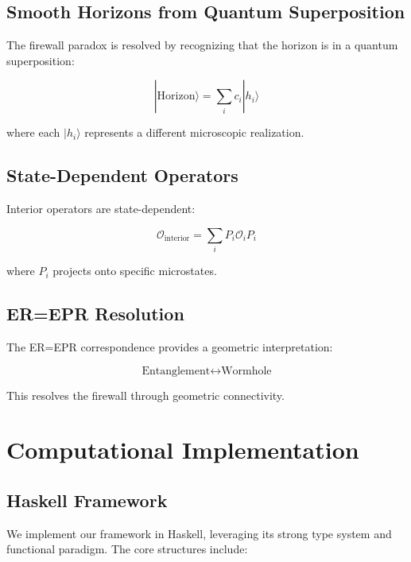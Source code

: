 \documentclass[12pt,a4paper]{article}
\begin{document}
\subsection{Smooth Horizons from Quantum Superposition}

The firewall paradox is resolved by recognizing that the horizon is in a quantum superposition:

\begin{equation}
|\text{Horizon}\rangle = \sum_i c_i |h_i\rangle
\end{equation}

where each $|h_i\rangle$ represents a different microscopic realization.

\subsection{State-Dependent Operators}

Interior operators are state-dependent:

\begin{equation}
\mathcal{O}_{\text{interior}} = \sum_i P_i \mathcal{O}_i P_i
\end{equation}

where $P_i$ projects onto specific microstates.

\subsection{ER=EPR Resolution}

The ER=EPR correspondence provides a geometric interpretation:

\begin{equation}
\text{Entanglement} \leftrightarrow \text{Wormhole}
\end{equation}

This resolves the firewall through geometric connectivity.

\section{Computational Implementation}

\subsection{Haskell Framework}

We implement our framework in Haskell, leveraging its strong type system and functional paradigm. The core structures include:
\end{document}
